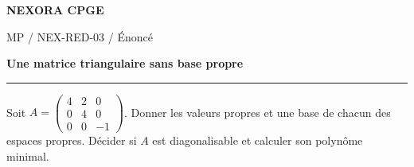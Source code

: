 \documentclass[11pt,a4paper]{article}
\begin{document}
{\small\bfseries\color{nexorablue} NEXORA CPGE}\par
{\small MP / NEX-RED-03 / Énoncé}\par
{\LARGE\bfseries Une matrice triangulaire sans base propre}\par
\vspace{0.25em}\hrule\vspace{0.6em}

Soit $A=\begin{pmatrix}4&2&0\\0&4&0\\0&0&-1\end{pmatrix}$. Donner les valeurs propres et une base de chacun des espaces propres. Décider si $A$ est diagonalisable et calculer son polynôme minimal.
\end{document}
